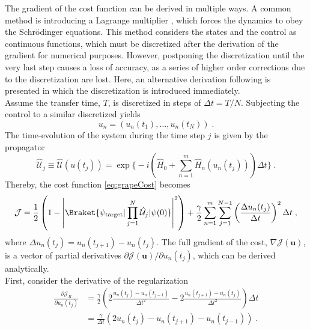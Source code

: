 The gradient of the cost function can be derived in multiple ways. A common method is introducing a Lagrange multiplier \cite{Hohenester2007, Winckel2008, BECcontrol}, which forces the dynamics to obey the Schrödinger equations. This method considers the states and the control as continuous functions, which must be discretized after the derivation of the gradient for numerical purposes. However, postponing the discretization until the very last step causes a loss of accuracy, as a series of higher order corrections due to the discretization are lost.
Here, an alternative derivation following \cite{Khaneja2005, deFouquieres2011} is presented in which the discretization is introduced immediately. \\
Assume the transfer time, $T$, is discretized in steps of $\Delta t = T/N$. Subjecting the control to a similar discretized yields
\begin{equation}
	u_n = \left( u_n (t_1) , \ldots , u_n (t_N)  \right)  \; .
\end{equation}
The time-evolution of the system during the time step $j$ is given by the propagator
\begin{equation}
	\hat{\mathcal{U}}_j \equiv \hat{\mathcal{U}} (u(t_j)) = \exp \bigg\{ -i \left( \hat{H}_0 + \sum_{n = 1}^{m}  \hat{H}_n (u_n(t_j))  \right) \Delta t \bigg\} \; . 
\end{equation} 
Thereby, the cost function \eqref{eq:grapeCost} becomes
\begin{equation}
	\mathcal{J} = \frac{1}{2} \left( 1 - \left\lvert \Braket{\psi_{\mathrm{target}} | \prod_{j = 1}^{N} \hat{\mathcal{U}}_j | \psi (0)} \right\rvert^2 \right) + \frac{\gamma}{2} \sum_{n = 1}^{m} \sum_{j = 1}^{N-1} \left( \frac{\Delta u_n (t_j)}{\Delta t} \right)^2 \Delta t \; ,
	\label{eq:discreteCost}
\end{equation}
where $\Delta u_n (t_j) =  u_n (t_{j+1}) - u_n (t_j)$. The full gradient of the cost, $\nabla \mathcal{J}(\boldsymbol{u})$, is a vector of partial derivatives ${\partial \mathcal{J}(\boldsymbol{u})}/{\partial u_n (t_j)}$, which can be derived analytically.\\
First, consider the derivative of the regularization
\begin{align}
	\frac{\partial \mathcal{J}_R}{\partial u_n (t_j)} &= \frac{\gamma}{2} \left( 2 \frac{u_n (t_j) - u_n (t_{j-1})}{\Delta t^2} - 2 \frac{u_n (t_{j+1}) - u_n (t_j)}{\Delta t^2} \right) \Delta t \nonumber \\
	&= \frac{\gamma}{\Delta t} \left( 2 u_n (t_j) - u_n (t_{j+1}) - u_n (t_{j-1}) \right) \; . \label{eq:regularizationGrad}
\end{align}
